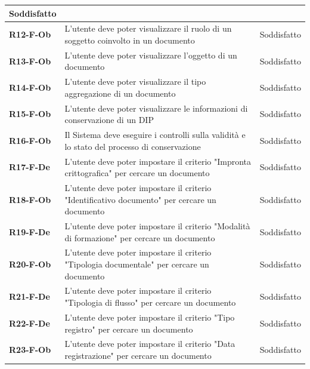 \documentclass[a4paper,12pt]{article}
\begin{document}
{{{\begin{longtable}{|>{\centering\arraybackslash}m{}|>{\centering\arraybackslash}m{}|>{\centering\arraybackslash}m{}|}
                Soddisfatto \\ 
                \hline
                \textbf{R12-F-Ob} & L'utente deve poter visualizzare il ruolo di un soggetto coinvolto in un documento & Soddisfatto \\ 
                \hline
                \textbf{R13-F-Ob} & L'utente deve poter visualizzare l'oggetto di un documento & Soddisfatto \\ 
                \hline
                \textbf{R14-F-Ob} & L'utente deve poter visualizzare il tipo aggregazione di un documento & Soddisfatto \\ 
                \hline
                \textbf{R15-F-Ob} & L'utente deve poter visualizzare le informazioni di conservazione di un DIP & Soddisfatto \\ 
                \hline
                \textbf{R16-F-Ob} & Il Sistema deve eseguire i controlli sulla validità e lo stato del processo di conservazione & Soddisfatto \\ 
                \hline
                \textbf{R17-F-De} & L'utente deve poter impostare il criterio "Impronta crittografica" per cercare un documento & 
                Soddisfatto \\ 
                \hline
                \textbf{R18-F-Ob} & L'utente deve poter impostare il criterio "Identificativo documento" per cercare un documento & 
                Soddisfatto \\ 
                \hline
                \textbf{R19-F-De} & L'utente deve poter impostare il criterio "Modalità di formazione" per cercare un documento & 
                Soddisfatto \\ 
                \hline
                \textbf{R20-F-Ob} & L'utente deve poter impostare il criterio "Tipologia documentale" per cercare un documento & 
                Soddisfatto \\ 
                \hline
                \textbf{R21-F-De} & L'utente deve poter impostare il criterio "Tipologia di flusso" per cercare un documento & 
                Soddisfatto \\ 
                \hline
                \textbf{R22-F-De} & L'utente deve poter impostare il criterio "Tipo registro" per cercare un documento & 
                Soddisfatto \\
                \hline
                \textbf{R23-F-Ob} & L'utente deve poter impostare il criterio "Data registrazione" per cercare un documento & 
                Soddisfatto \\ 

\end{longtable}}}}
\end{document}
